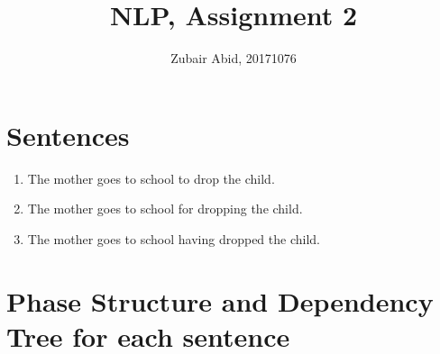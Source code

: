 \documentclass[12pt,a4paper]{article}
\title{NLP, Assignment 2}
\author{Zubair Abid, 20171076}
\date{}
\begin{document}
	\maketitle

	\section{Sentences}
	\begin{enumerate}
		\item The mother goes to school to drop the child.
		
		\item The mother goes to school for dropping the child.
		
		\item The mother goes to school having dropped the child.
		
	\end{enumerate}		
	
	\section{Phase Structure and Dependency Tree for each sentence}
\end{document}
